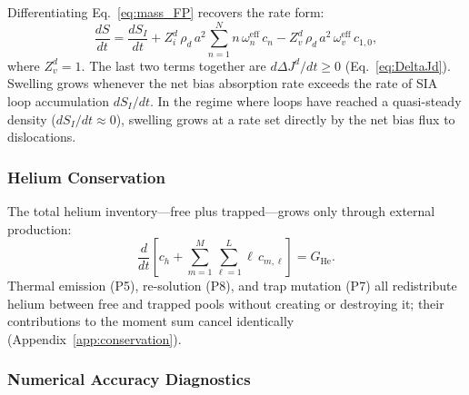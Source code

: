 \documentclass[pdflatex,sn-basic]{sn-jnl} %
\begin{document}
Differentiating Eq.~\eqref{eq:mass_FP} recovers the rate form:
\begin{equation}\label{eq:dSdt}
    \frac{dS}{dt}
    = \frac{dS_I}{dt}
    + Z_i^d\,\rho_d\,a^2\sum_{n=1}^{N} n\,\omega_n^{\mathrm{eff}}\,c_n
    - Z_v^d\,\rho_d\,a^2\,\omega_v^{\mathrm{eff}}\,c_{1,0},
\end{equation}
where $Z_v^d = 1$. The last two terms together are $d\Delta J^d/dt \geq 0$
(Eq.~\ref{eq:DeltaJd}). Swelling grows whenever the net bias absorption
rate exceeds the rate of SIA loop accumulation $dS_I/dt$. In the regime
where loops have reached a quasi-steady density ($dS_I/dt \approx 0$),
swelling grows at a rate set directly by the net bias flux to dislocations.

\subsubsection{Helium Conservation}

The total helium inventory---free plus trapped---grows only through
external production:
\begin{equation}\label{eq:mass_He}
    \frac{d}{dt}\!\left[c_h
    + \sum_{m=1}^{M}\sum_{\ell=1}^{L} \ell\,c_{m,\ell}\right]
    = G_{\mathrm{He}}.
\end{equation}
Thermal emission (P5), re-solution (P8), and trap mutation (P7) all
redistribute helium between free and trapped pools without creating or
destroying it; their contributions to the moment sum cancel identically
(Appendix~\ref{app:conservation}).

\subsubsection{Numerical Accuracy Diagnostics}
\label{sec:conservation_check}
\end{document}
